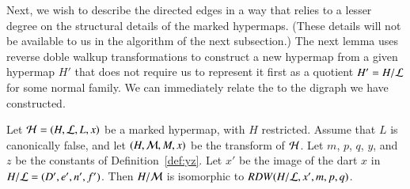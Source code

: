 %

Next, we wish to describe the directed edges in a way that relies to a
lesser degree on the structural details of the marked hypermaps.
(These details will not be available to us in the algorithm of the
next subsection.)  The next lemma uses reverse doble walkup
transformations to construct a new hypermap from a given hypermap $H'$
that does not require us to represent it first as a quotient $H' =
H/{\cal L}$ for some normal family.
We can immediately relate the to the digraph we
have constructed.   

\begin{lemma}
Let ${\cal H} =(H,{\cal L},L,x)$ be a marked hypermap,
  with $H$ restricted.  Assume that $L$ is canonically false, and let 
$(H,{\cal{M}},M,x)$ be 
  the transform of $\cal H$.   
Let $m$, $p$, $q$, $y$, and $z$ be
  the constants of Definition~\ref{def:yz}.  Let $x'$ be the
  image of the dart $x$ in $H/{\cal L} = (D',e',n',f')$.
Then $H/{\cal M}$ is isomorphic to $RDW(H/{\cal{L}},x',m,p,q)$.
\end{lemma}


